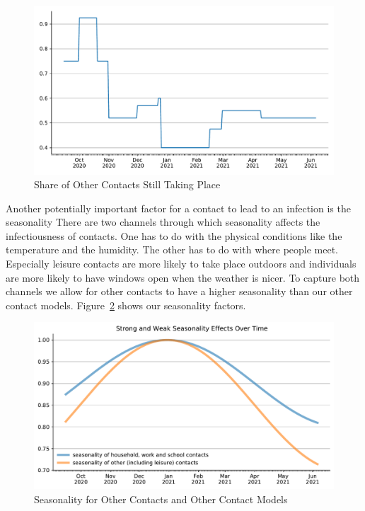 \begin{figure}
\centering
\includegraphics[width=\textwidth]{../figures/results/figures/data/other_multiplier}
\caption{Share of Other Contacts Still Taking Place}
\label{fig:other_multiplier}
\floatfoot{\noindent}
\end{figure}

Another potentially important factor for a contact to lead to an infection is the
seasonality \citep{Kuehn2020, Carlson2020} There are two channels through which
seasonality affects the infectiousness of contacts. One has to do with the physical
conditions like the temperature and the humidity. The other has to do with where people
meet. Especially leisure contacts are more likely to take place outdoors and individuals
are more likely to have windows open when the weather is nicer. To capture both channels
we allow for other contacts to have a higher seasonality than our other contact models.
Figure~\ref{fig:seasonality} shows our seasonality factors.

\begin{figure}
\centering
\includegraphics[width=\textwidth]{../figures/results/figures/data/seasonality}
\caption{Seasonality for Other Contacts and Other Contact Models}
\label{fig:seasonality}
\floatfoot{\noindent}
\end{figure}



